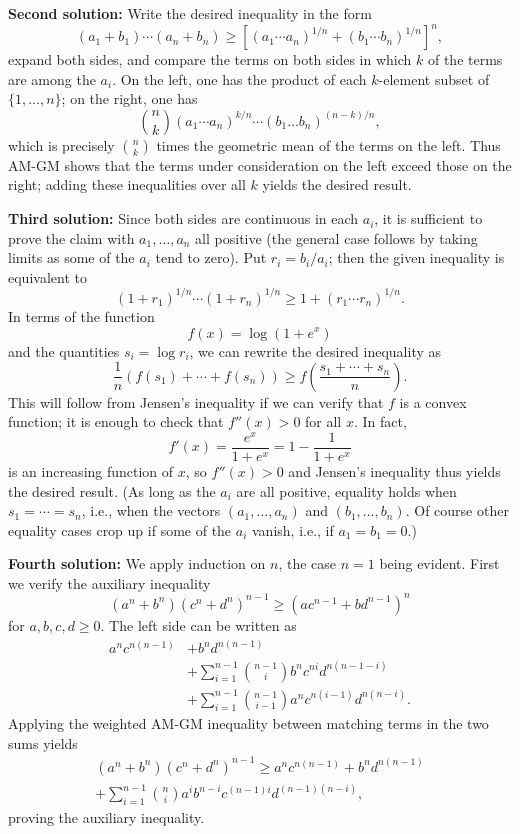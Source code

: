 \documentclass[amssymb,twocolumn,pra,10pt,aps]{revtex4-1}
\begin{document}
\begin{itemize}
\textbf{Second solution:}
Write the desired inequality in the form
\[
(a_1 + b_1)\cdots(a_n+b_n) \geq
[(a_1\cdots a_n)^{1/n} + (b_1\cdots b_n)^{1/n}]^n,
\]
expand both sides, and compare the terms on both sides
in which $k$ of the terms are among the $a_i$. On the left,
one has the product of each $k$-element subset of $\{1, \dots, n\}$;
on the right, one has
\[
\binom{n}{k} (a_1\cdots a_n)^{k/n} \cdots (b_1 \dots b_n)^{(n-k)/n},
\]
which is precisely $\binom{n}{k}$ times the geometric mean of the terms
on the left.  Thus AM-GM shows that the terms under consideration on the
left exceed those on the right; adding these inequalities over all $k$
yields the desired result.

\textbf{Third solution:}
Since both sides are continuous in each $a_i$, it is sufficient to
prove the claim with $a_1, \dots, a_n$ all positive (the general case
follows by taking limits as some of the $a_i$ tend to zero).
Put $r_i = b_i/a_i$; then the given inequality is equivalent to
\[
(1 + r_1)^{1/n} \cdots (1+r_n)^{1/n} \geq 1 + (r_1\cdots r_n)^{1/n}.
\]
In terms of the function
\[
f(x) = \log(1 + e^x)
\]
and the quantities $s_i = \log r_i$,
we can rewrite the desired inequality as
\[
\frac{1}{n}(f(s_1) + \cdots + f(s_n)) \geq f\left( \frac{s_1 + \cdots +
s_n}{n} \right).
\]
This will follow from Jensen's inequality if we can verify that $f$
is a convex function; it is enough to check that $f''(x) > 0$ for all $x$.
In fact,
\[
f'(x) = \frac{e^x}{1+e^x} = 1 - \frac{1}{1+e^x}
\]
is an increasing function of $x$, so $f''(x) > 0$ and Jensen's inequality
thus yields the desired result. (As long as the $a_i$ are all positive,
equality holds when $s_1 = \cdots = s_n$, i.e., when the vectors
$(a_1, \dots, a_n)$ and $(b_1, \dots, b_n)$. Of course other equality
cases crop up if some of the $a_i$ vanish, i.e., if $a_1=b_1=0$.)

\textbf{Fourth solution:}
We apply induction on $n$, the case $n=1$ being evident.
First we verify the auxiliary inequality
\[
(a^n + b^n)(c^n + d^n)^{n-1} \geq (ac^{n-1} + b d^{n-1})^n
\]
for $a,b,c,d \geq 0$.
The left side can be written as
\begin{align*}
a^n c^{n(n-1)} &+ b^n d^{n(n-1)} \\
&+ \sum_{i=1}^{n-1} \binom{n-1}{i} b^n c^{ni} d^{n(n-1-i)} \\
&+ \sum_{i=1}^{n-1} \binom{n-1}{i-1} a^n c^{n(i-1)} d^{n(n-i)}.
\end{align*}
Applying the weighted AM-GM inequality between matching terms in the two
sums yields
\begin{multline*}
(a^n + b^n)(c^n + d^n)^{n-1} \geq a^n c^{n(n-1)} + b^n d^{n(n-1)} \\
+ \sum_{i=1}^{n-1} \binom{n}{i} a^i b^{n-i} c^{(n-1)i} d^{(n-1)(n-i)},
\end{multline*}
proving the auxiliary inequality.


\end{itemize}
\end{document}
